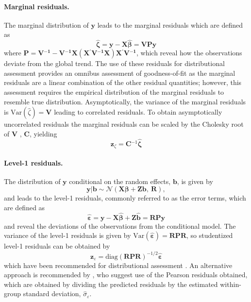 \documentclass[12pt]{article} %
\newcommand{\inv}{\ensuremath{^{-1}}}
\newcommand{\trans}{\ensuremath{^\prime}}
\newcommand{\var}{\ensuremath{\mathrm{Var}}}
\begin{document}
\paragraph{Marginal residuals.} 
The marginal distribution of $\bm{y}$ leads to the marginal residuals which are defined as
%
\begin{equation}\label{eq:marginalresid}
\widehat{\bm{\zeta}}  = \bm{y} - \bm{X} \widehat{\bm{\beta}} =  \bm{V P y}
\end{equation}
%
where $ \bm{P} = \bm{V\inv} - \bm{V\inv X} \left( \bm{X\trans V\inv X} \right) \bm{X \trans V\inv}$, which reveal how the observations deviate from the global trend. The use of these residuals for distributional assessment provides an omnibus assessment of goodness-of-fit as the marginal residuals are a linear combination of the other residual quantities; however, this assessment requires the empirical distribution of the marginal residuals to resemble true distribution. Asymptotically, the variance of the marginal residuals is $\var(\widehat{\zeta}) = \bm{V}$ leading to correlated residuals. To obtain asymptotically uncorrelated residuals the marginal residuals can be scaled by the Cholesky root of $\bm{V}$ \citep{Houseman:2004gq}, $\bm{C}$, yielding
%
\begin{equation}\label{eq:choleskyresid}
\bm{z}_{\zeta}  = \bm{C}\inv \widehat{\bm{\zeta}}
\end{equation}
%


\paragraph{Level-1 residuals.}
The distribution of $\bm{y}$ conditional on the random effects, $\bm{b}$, is given by
%
\begin{equation}\label{eq:marginalmodel}
	\bm{y} | \bm{b} \sim \mathcal{N}( \bm{X\beta} + \bm{Zb},\ \bm{R} ),
\end{equation}
%
and leads to the level-1 residuals, commonly referred to as the error terms, which are defined as
%
\begin{equation}\label{eq:lev1resid}
	\widehat{\bm{\varepsilon}} = \bm{y} - \bm{X \widehat{\beta}} + \bm{Z \widehat{b}} = \bm{R P y}
\end{equation}
%
and reveal the deviations of the observations from the conditional model. The variance of the level-1 residuals is given by $\var(\widehat{\bm{\varepsilon}}) = \bm{ R P R }$, so studentized level-1 residuals can be obtained by 
%
\begin{equation}\label{eq:lev1-std}
\bm{z}_{\varepsilon} =  \text{diag} \left(\bm{RPR} \right)^{-1/2} \widehat{\bm{\varepsilon}}
\end{equation}
%
which have been recommended for distributional assessment \citep{Nobre:2007ej}. An alternative approach is recommended by \cite[Section 4.3]{Pinhiero:2000vf}, who suggest use of the Pearson residuals obtained, which are obtained by dividing the predicted residuals by the estimated within-group standard deviation, $\widehat{\sigma}_\varepsilon$. 
\end{document}
